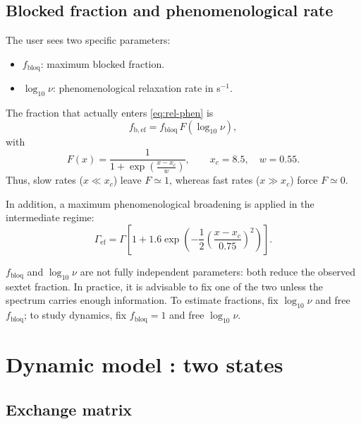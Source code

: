 \subsection{Blocked fraction and phenomenological rate}

The user sees two specific parameters:
\begin{itemize}[leftmargin=*]
  \item $f_{\mathrm{bloq}}$: maximum blocked fraction.
  \item $\log_{10}\nu$: phenomenological relaxation rate in s$^{-1}$.
\end{itemize}
The fraction that actually enters \eqref{eq:rel-phen} is
\begin{equation}
  f_{\mathrm{b,ef}}=f_{\mathrm{bloq}}\,F(\log_{10}\nu),
  \label{eq:fb-eff}
\end{equation}
with
\begin{equation}
  F(x)=\frac{1}{1+\exp\left(\frac{x-x_c}{w}\right)},
  \qquad x_c=8.5,\quad w=0.55.
\end{equation}
Thus, slow rates ($x\ll x_c$) leave $F\simeq 1$, whereas fast rates ($x\gg x_c$)
force $F\simeq 0$.

In addition, a maximum phenomenological broadening is applied in the intermediate
regime:
\begin{equation}
  \Gamma_{\mathrm{ef}}=\Gamma\left[1+1.6\exp\left(-\frac{1}{2}
  \left(\frac{x-x_c}{0.75}\right)^2\right)\right].
\end{equation}

\begin{aviso}
$f_{\mathrm{bloq}}$ and $\log_{10}\nu$ are not fully independent parameters: both
reduce the observed sextet fraction. In practice, it is advisable to fix one of
the two unless the spectrum carries enough information. To estimate fractions, fix
$\log_{10}\nu$ and free $f_{\mathrm{bloq}}$; to study dynamics, fix
$f_{\mathrm{bloq}}=1$ and free $\log_{10}\nu$.
\end{aviso}

\section{Dynamic model : two states}

\subsection{Exchange matrix}

